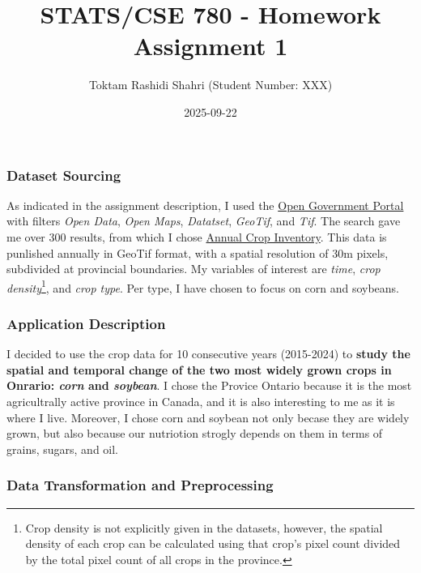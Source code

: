 \documentclass[
  11pt,
  letterpaper,
  DIV=11,
  numbers=noendperiod]{scrartcl}
\title{STATS/CSE 780 - Homework Assignment 1}
\author{Toktam Rashidi Shahri (Student Number: XXX)}
\date{2025-09-22}
\begin{document}
\maketitle


\newpage

\subsubsection{Dataset Sourcing}\label{dataset-sourcing}

As indicated in the assignment description, I used the
\href{https://search.open.canada.ca/opendata/}{Open Government Portal}
with filters \emph{Open Data}, \emph{Open Maps}, \emph{Datatset},
\emph{GeoTif}, and \emph{Tif}. The search gave me over 300 results, from
which I chose
\href{https://open.canada.ca/data/en/dataset/ba2645d5-4458-414d-b196-6303ac06c1c9}{Annual
Crop Inventory}. This data is punlished annually in GeoTif format, with
a spatial resolution of 30m pixels, subdivided at provincial boundaries.
My variables of interest are \emph{time}, \emph{crop
density}\footnote{Crop density is not explicitly given in the datasets,
  however, the spatial density of each crop can be calculated using that
  crop's pixel count divided by the total pixel count of all crops in
  the province.}, and \emph{crop type}. Per type, I have chosen to focus
on corn and soybeans.

\subsubsection{Application Description}\label{application-description}

I decided to use the crop data for 10 consecutive years (2015-2024) to
\textbf{study the spatial and temporal change of the two most widely
grown crops in Onrario: \emph{corn} and \emph{soybean}}. I chose the
Provice Ontario because it is the most agricultrally active province in
Canada, and it is also interesting to me as it is where I live.
Moreover, I chose corn and soybean not only becase they are widely
grown, but also because our nutriotion strogly depends on them in terms
of grains, sugars, and oil.

\subsubsection{Data Transformation and
Preprocessing}\label{data-transformation-and-preprocessing}
\end{document}
